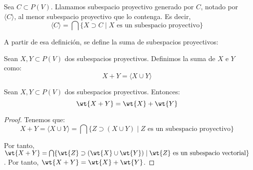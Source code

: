 \begin{definicion}
    Sea $C\subset P(V)$. Llamamos subespacio proyectivo generado por $C$, notado por $\langle C \rangle$, al menor subespacio proyectivo que lo contenga. Es decir,
    \begin{equation*}
        \langle C \rangle = \bigcap \{X\supset C\mid X\text{ es un subespacio proyectivo}\}
    \end{equation*}
\end{definicion}

A partir de esa definición, se define la suma de subespacios proyectivos:
\begin{definicion}[Suma]
    Sean $X,Y\subset P(V)$ dos subespacios proyectivos. Definimos la suma de $X$ e $Y$ como:
    \begin{equation*}
        X+Y = \langle X\cup Y\rangle
    \end{equation*}
\end{definicion}

\begin{prop}
    Sean $X,Y\subset P(V)$ dos subespacios proyectivos. Entonces:
    \begin{equation*}
        \wt{X+Y} = \wt{X} + \wt{Y}
    \end{equation*}
\end{prop}
\begin{proof}
    Tenemos que:
    \begin{equation*}
        X+Y = \langle X\cup Y\rangle = \bigcap \{Z\supset (X\cup Y)\mid Z\text{ es un subespacio proyectivo}\}
    \end{equation*}

    Por tanto, $\wt{X+Y} = \bigcap \{\wt{Z}\supset (\wt{X}\cup \wt{Y})\mid \wt{Z}\text{ es un subespacio vectorial}\}$. Por tanto, $\wt{X+Y} = \wt{X} + \wt{Y}$.
\end{proof}

